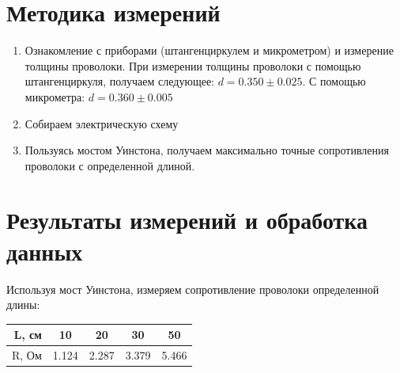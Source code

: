\documentclass[a4paper, 12pt]{article}
\begin{document}
\section {Методика измерений}
    \begin{enumerate}
        \item Ознакомление с приборами (штангенциркулем и микрометром) и измерение толщины проволоки. При измерении толщины проволоки с помощью штангенциркуля, получаем следующее: $d = 0.350 \pm 0.025$. С помощью микрометра: $d = 0.360 \pm 0.005$
        \item Собираем электрическую схему
        \item Пользуясь мостом Уинстона, получаем максимально точные сопротивления проволоки с определенной длиной. 
    \end{enumerate}

\section {Результаты измерений и обработка данных}
    Используя мост Уинстона, измеряем сопротивление проволоки определенной длины:
    \begin{table}[H]
        \centering
        \begin{tabular}{|r|c|c|c|c|}
        \hline
        L, см & 10 & 20 & 30 & 50 \\ \hline
        R, Ом & 1.124 & 2.287 & 3.379 & 5.466 \\ \hline 
        \end{tabular}
    \end{table}
    
\end{document}
